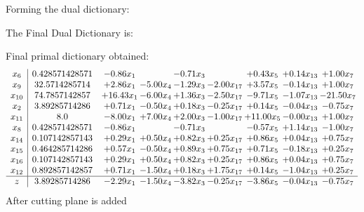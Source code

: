 \documentclass[8pt]{article}
\begin{document}
Forming the dual dictionary:

The Final Dual Dictionary is: 

 Final primal dictionary obtained: 
\[\begin{array}{c| c c@{\hskip 2pt} c@{\hskip 2pt} c@{\hskip 2pt} c@{\hskip 2pt} c@{\hskip 2pt} c@{\hskip 2pt} c@{\hskip 2pt} }
 x_{6}   &  0.428571428571 & -0.86 x_{1} &   & -0.71 x_{3} &   & +  0.43 x_{5} & +  0.14 x_{13} & +  1.00 x_{7}\\
 x_{9}   &  32.5714285714 & +  2.86 x_{1} & -5.00 x_{4} & -1.29 x_{3} & -2.00 x_{17} & +  3.57 x_{5} & -0.14 x_{13} & +  1.00 x_{7}\\
 x_{10}   &  74.7857142857 & + 16.43 x_{1} & -6.00 x_{4} & +  1.36 x_{3} & -2.50 x_{17} & -9.71 x_{5} & -1.07 x_{13} & -21.50 x_{7}\\
 x_{2}   &  3.89285714286 & +  0.71 x_{1} & -0.50 x_{4} & +  0.18 x_{3} & -0.25 x_{17} & +  0.14 x_{5} & -0.04 x_{13} & -0.75 x_{7}\\
 x_{11}   &  8.0 & -8.00 x_{1} & +  7.00 x_{4} & +  2.00 x_{3} & -1.00 x_{17} & + 11.00 x_{5} & -0.00 x_{13} & +  1.00 x_{7}\\
 x_{8}   &  0.428571428571 & -0.86 x_{1} &   & -0.71 x_{3} &   & -0.57 x_{5} & +  1.14 x_{13} & -1.00 x_{7}\\
 x_{14}   &  0.107142857143 & +  0.29 x_{1} & +  0.50 x_{4} & +  0.82 x_{3} & +  0.25 x_{17} & +  0.86 x_{5} & +  0.04 x_{13} & +  0.75 x_{7}\\
 x_{15}   &  0.464285714286 & +  0.57 x_{1} & -0.50 x_{4} & +  0.89 x_{3} & +  0.75 x_{17} & +  0.71 x_{5} & -0.18 x_{13} & +  0.25 x_{7}\\
 x_{16}   &  0.107142857143 & +  0.29 x_{1} & +  0.50 x_{4} & +  0.82 x_{3} & +  0.25 x_{17} & +  0.86 x_{5} & +  0.04 x_{13} & +  0.75 x_{7}\\
 x_{12}   &  0.892857142857 & +  0.71 x_{1} & -1.50 x_{4} & +  0.18 x_{3} & +  1.75 x_{17} & +  0.14 x_{5} & -1.04 x_{13} & +  0.25 x_{7}\\
\hline
z    &  3.89285714286 & -2.29 x_{1} & -1.50 x_{4} & -3.82 x_{3} & -0.25 x_{17} & -3.86 x_{5} & -0.04 x_{13} & -0.75 x_{7}\\
\end{array}\]
 After cutting plane is added 
\end{document}
